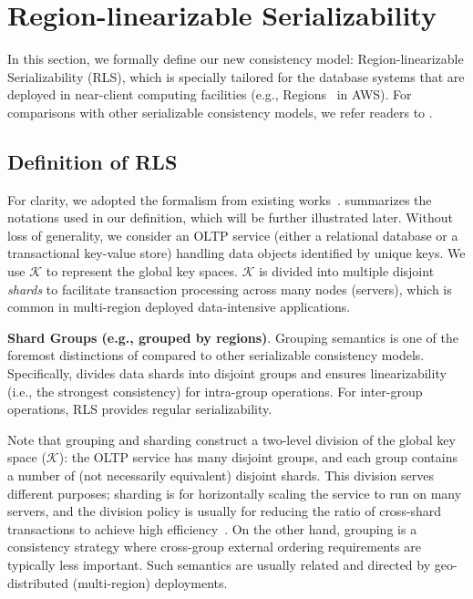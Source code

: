 \section{Region-linearizable Serializability}\label{sec:model}

In this section, we formally define our new consistency model: Region-linearizable Serializability (RLS), which is specially tailored for the database systems that are deployed in near-client computing facilities (e.g., Regions~\cite{aws:region} in AWS). For comparisons with other serializable consistency models, we refer readers to .

\subsection{Definition of RLS}\label{sec:model:def}

For clarity, we adopted the formalism from existing works~\cite{rss}.  summarizes the notations used in our definition, which will be further illustrated later.
Without loss of generality, we consider an OLTP service (either a relational database or a transactional key-value store) handling data objects identified by unique keys. We use $\mathcal{K}$ to represent the global key spaces. $\mathcal{K}$ is divided into multiple disjoint \textit{shards} to facilitate transaction processing across many nodes (servers), which is common in multi-region deployed data-intensive applications.

\vspace{2pt}
\noindent\textbf{Shard Groups (e.g., grouped by regions)}. Grouping 
semantics is one of the foremost distinctions of \xxcons compared to other serializable consistency models. Specifically, \xxcons divides data shards into disjoint groups and 
ensures linearizability (i.e., the strongest consistency) for intra-group operations. For inter-group operations, RLS provides regular serializability.

Note that grouping and sharding construct a two-level division of 
the global key space ($\mathcal{K}$): the OLTP service has many disjoint groups,
and each group contains a number of (not necessarily equivalent) disjoint 
shards. This division serves different purposes; sharding is for horizontally scaling the 
service to run on many servers, and the division policy 
is usually for reducing the ratio of cross-shard transactions to achieve 
high efficiency~\cite{nguyen2023detock}.
On the other hand, grouping is a consistency strategy where cross-group external ordering requirements are typically less important. Such semantics are usually related and directed by geo-distributed (multi-region) deployments. 

